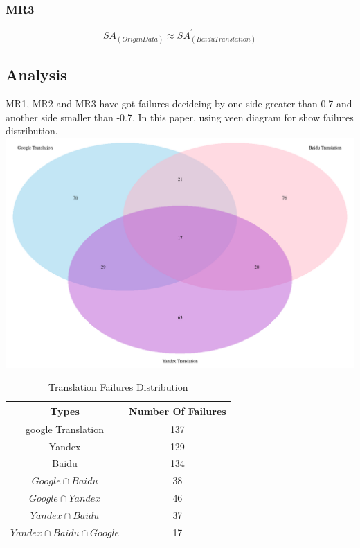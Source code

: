 \documentclass[conference]{IEEEtran}
\begin{document}
\begin{CJK*}{UTF8}{gbsn}
\subsubsection{MR3}
$$SA_{(Origin Data)} \approx SA^{\prime}_{(Baidu Translation)}$$
\subsection{Analysis}
MR1, MR2 and MR3 have got failures decideing by one side greater than 0.7 and
another side smaller than -0.7. In this paper, using veen diagram for show
failures distribution.
\includegraphics[width=0.35\paperwidth]{./img/veen.png}

  \begin{table}[h]
    \caption {Translation Failures Distribution}
    \begin{center}
      \begin{tabular}{|c|c|}
        \hline
        Types & Number Of Failures \\
        \hline\hline
        google Translation & 137\\
        \hline
        Yandex & 129 \\
        \hline
        Baidu & 134 \\
        \hline
        $Google \cap Baidu$ & 38 \\
        \hline
        $Google \cap Yandex$ & 46 \\
        \hline
        $Yandex \cap Baidu$ & 37 \\
        \hline
        $Yandex \cap Baidu \cap Google$ & 17 \\
        \hline
      \end{tabular}
    \end{center}
  \end{table}\\



\end{CJK*}
\end{document}
